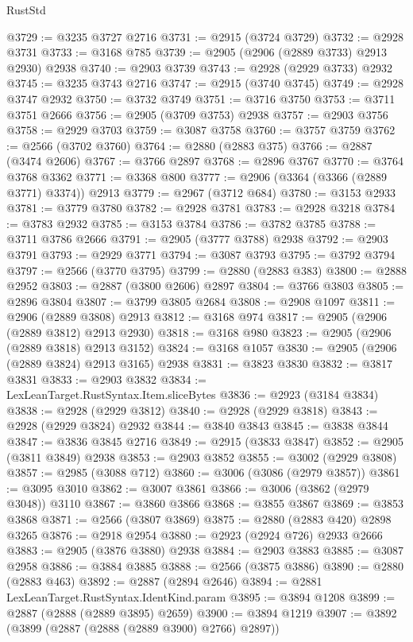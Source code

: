 \begin{lexlean}{RustStd}
\begin{coremodule}
@3729 := @3235 @3727 @2716
@3731 := @2915 (@3724 @3729)
@3732 := @2928 @3731
@3733 := @3168 @785
@3739 := @2905 (@2906 (@2889 @3733) @2913 @2930) @2938
@3740 := @2903 @3739
@3743 := @2928 (@2929 @3733) @2932
@3745 := @3235 @3743 @2716
@3747 := @2915 (@3740 @3745)
@3749 := @2928 @3747 @2932
@3750 := @3732 @3749
@3751 := @3716 @3750
@3753 := @3711 @3751 @2666
@3756 := @2905 (@3709 @3753) @2938
@3757 := @2903 @3756
@3758 := @2929 @3703
@3759 := @3087 @3758
@3760 := @3757 @3759
@3762 := @2566 (@3702 @3760)
@3764 := @2880 (@2883 @375)
@3766 := @2887 (@3474 @2606)
@3767 := @3766 @2897
@3768 := @2896 @3767
@3770 := @3764 @3768 @3362
@3771 := @3368 @800
@3777 := @2906 (@3364 (@3366 (@2889 @3771) @3374)) @2913
@3779 := @2967 (@3712 @684)
@3780 := @3153 @2933
@3781 := @3779 @3780
@3782 := @2928 @3781
@3783 := @2928 @3218
@3784 := @3783 @2932
@3785 := @3153 @3784
@3786 := @3782 @3785
@3788 := @3711 @3786 @2666
@3791 := @2905 (@3777 @3788) @2938
@3792 := @2903 @3791
@3793 := @2929 @3771
@3794 := @3087 @3793
@3795 := @3792 @3794
@3797 := @2566 (@3770 @3795)
@3799 := @2880 (@2883 @383)
@3800 := @2888 @2952
@3803 := @2887 (@3800 @2606) @2897
@3804 := @3766 @3803
@3805 := @2896 @3804
@3807 := @3799 @3805 @2684
@3808 := @2908 @1097
@3811 := @2906 (@2889 @3808) @2913
@3812 := @3168 @974
@3817 := @2905 (@2906 (@2889 @3812) @2913 @2930)
@3818 := @3168 @980
@3823 := @2905 (@2906 (@2889 @3818) @2913 @3152)
@3824 := @3168 @1057
@3830 := @2905 (@2906 (@2889 @3824) @2913 @3165) @2938
@3831 := @3823 @3830
@3832 := @3817 @3831
@3833 := @2903 @3832
@3834 := LexLeanTarget.RustSyntax.Item.sliceBytes
@3836 := @2923 (@3184 @3834)
@3838 := @2928 (@2929 @3812)
@3840 := @2928 (@2929 @3818)
@3843 := @2928 (@2929 @3824) @2932
@3844 := @3840 @3843
@3845 := @3838 @3844
@3847 := @3836 @3845 @2716
@3849 := @2915 (@3833 @3847)
@3852 := @2905 (@3811 @3849) @2938
@3853 := @2903 @3852
@3855 := @3002 (@2929 @3808)
@3857 := @2985 (@3088 @712)
@3860 := @3006 (@3086 (@2979 @3857))
@3861 := @3095 @3010
@3862 := @3007 @3861
@3866 := @3006 (@3862 (@2979 @3048)) @3110
@3867 := @3860 @3866
@3868 := @3855 @3867
@3869 := @3853 @3868
@3871 := @2566 (@3807 @3869)
@3875 := @2880 (@2883 @420) @2898 @3265
@3876 := @2918 @2954
@3880 := @2923 (@2924 @726) @2933 @2666
@3883 := @2905 (@3876 @3880) @2938
@3884 := @2903 @3883
@3885 := @3087 @2958
@3886 := @3884 @3885
@3888 := @2566 (@3875 @3886)
@3890 := @2880 (@2883 @463)
@3892 := @2887 (@2894 @2646)
@3894 := @2881 LexLeanTarget.RustSyntax.IdentKind.param
@3895 := @3894 @1208
@3899 := @2887 (@2888 (@2889 @3895) @2659)
@3900 := @3894 @1219
@3907 := @3892 (@3899 (@2887 (@2888 (@2889 @3900) @2766) @2897))

\end{coremodule}
\end{lexlean}
